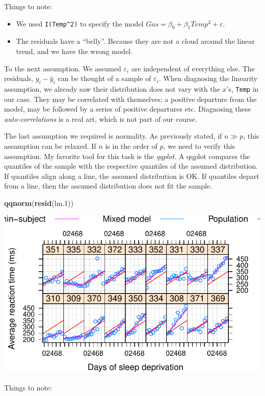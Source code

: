\documentclass[]{book}
\newenvironment{Shaded}{\begin{snugshade}}{\end{snugshade}}
\newcommand{\FloatTok}[1]{\textcolor[rgb]{0.00,0.00,0.81}{#1}}
\newcommand{\KeywordTok}[1]{\textcolor[rgb]{0.13,0.29,0.53}{\textbf{#1}}}
\newcommand{\NormalTok}[1]{#1}
\providecommand{\tightlist}{%
  \setlength{\itemsep}{0pt}\setlength{\parskip}{0pt}}
\theoremstyle{definition}
\theoremstyle{definition}
\theoremstyle{definition}
\theoremstyle{remark}
\begin{document}
Things to note:

\begin{itemize}
\tightlist
\item
  We used \texttt{I(Temp\^{}2)} to specify the model \(Gas=\beta_0 + \beta_1 Temp^2+ \varepsilon\).
\item
  The residuals have a ``belly''.
  Because they are not a cloud around the linear trend, and we have the wrong model.
\end{itemize}

To the next assumption.
We assumed \(\varepsilon_i\) are independent of everything else.
The residuals, \(y_i-\hat y_i\) can be thought of a sample of \(\varepsilon_i\).
When diagnosing the linearity assumption, we already saw their distribution does not vary with the \(x\)'s, \texttt{Temp} in our case.
They may be correlated with themselves; a positive departure from the model, may be followed by a series of positive departures etc.
Diagnosing these \emph{auto-correlations} is a real art, which is not part of our course.

The last assumption we required is normality.
As previously stated, if \(n \gg p\), this assumption can be relaxed.
If \(n\) is in the order of \(p\), we need to verify this assumption.
My favorite tool for this task is the \emph{qqplot}.
A qqplot compares the quantiles of the sample with the respective quantiles of the assumed distribution.
If quantiles align along a line, the assumed distribution is OK.
If quantiles depart from a line, then the assumed distribution does not fit the sample.

\begin{Shaded}
\begin{Highlighting}[]
\KeywordTok{qqnorm}\NormalTok{(}\KeywordTok{resid}\NormalTok{(lm}\FloatTok{.1}\NormalTok{))}
\end{Highlighting}
\end{Shaded}

\includegraphics[width=0.5\linewidth]{Rcourse_files/figure-latex/unnamed-chunk-163-1}

Things to note:
\end{document}
